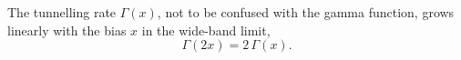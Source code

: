 \documentclass{article}
\begin{document}
The tunnelling rate $\Gamma(x)$, not to be confused with the gamma function, grows linearly
with the bias $x$ in the wide-band limit,
\begin{equation}
\Gamma(2x) = 2\,\Gamma(x) .
\label{eq:g1}
\end{equation}
\end{document}
